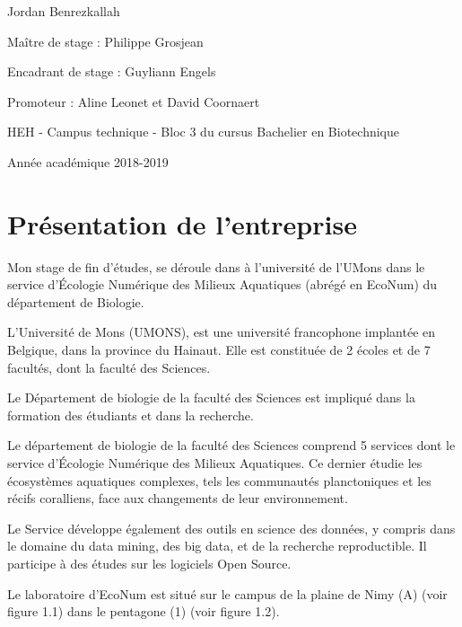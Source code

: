\documentclass[]{report}
\begin{document}
\begin{centering}
\Large

Jordan Benrezkallah

\vspace{2 cm}

\normalsize
Maître de stage : Philippe Grosjean

Encadrant de stage : Guyliann Engels

Promoteur : Aline Leonet et David Coornaert


\vspace{3.5 cm}

\normalsize
HEH - Campus technique -
Bloc 3 du cursus Bachelier en Biotechnique

Année académique 2018-2019

\end {centering}

\tableofcontents

\chapter{Présentation de
l'entreprise}\label{presentation-de-lentreprise}

Mon stage de fin d'études, se déroule dans à l'université de l'UMons
dans le service d'Écologie Numérique des Milieux Aquatiques (abrégé en
EcoNum) du département de Biologie.

L'Université de Mons (UMONS), est une université francophone implantée
en Belgique, dans la province du Hainaut. Elle est constituée de 2
écoles et de 7 facultés, dont la faculté des Sciences.

Le Département de biologie de la faculté des Sciences est impliqué dans
la formation des étudiants et dans la recherche.

Le département de biologie de la faculté des Sciences comprend 5
services dont le service d'Écologie Numérique des Milieux Aquatiques. Ce
dernier étudie les écosystèmes aquatiques complexes, tels les
communautés planctoniques et les récifs coralliens, face aux changements
de leur environnement.

Le Service développe également des outils en science des données, y
compris dans le domaine du data mining, des big data, et de la recherche
reproductible. Il participe à des études sur les logiciels Open Source.

Le laboratoire d'EcoNum est situé sur le campus de la plaine de Nimy (A)
(voir figure 1.1) dans le pentagone (1) (voir figure 1.2).
\end{document}
